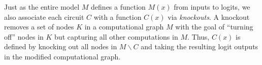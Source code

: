  




Just as the entire model $M$ defines a function $M(x)$ from inputs to logits, we also associate each circuit $C$ with a function $C(x)$ via \emph{knockouts}. A {knockout} removes a set of nodes $K$ in a computational graph $M$ with the goal of ``turning off'' nodes in $K$ but capturing all other computations in $M$. Thus, $C(x)$ is defined by knocking out all nodes in $M \backslash C$ and taking the resulting logit outputs in the modified computational graph.

